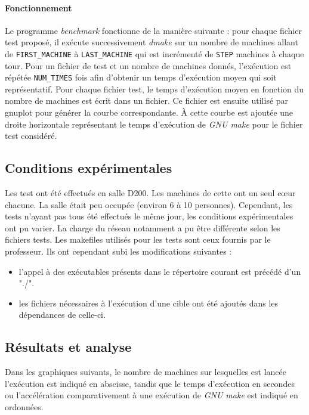 \documentclass[a4paper,12pt,twoside]{article}
\begin{document}
\paragraph{Fonctionnement}

Le programme \emph{benchmark} fonctionne de la manière suivante : pour
chaque fichier test proposé, il exécute successivement \emph{dmake} sur un nombre de
machines allant de \texttt{FIRST\_MACHINE} à \texttt{LAST\_MACHINE}
qui est incrémenté de \texttt{STEP} machines à chaque tour. Pour un
fichier de test et un nombre de machines donnés, l'exécution est
répétée \texttt{NUM\_TIMES} fois afin d'obtenir un temps d'exécution moyen
qui soit représentatif. 
Pour chaque fichier test, le temps d'exécution moyen en fonction du
nombre de machines est écrit dans un fichier. Ce fichier est ensuite
utilisé par gnuplot pour générer la courbe correspondante. À cette
courbe est ajoutée une droite horizontale représentant le temps
d'exécution de \emph{GNU make} pour le fichier test considéré. 

\subsection{Conditions expérimentales}

Les test ont été effectués en salle D200. Les machines de cette ont un
seul cœur chacune. La salle était peu occupée
(environ 6 à 10 personnes). Cependant, les tests n'ayant pas tous été
effectués le même jour, les conditions expérimentales ont pu
varier. La charge du réseau notamment a pu être différente selon les
fichiers tests. Les makefiles utilisés pour les tests sont ceux
fournis par le professeur. Ils ont cependant subi les modifications
suivantes : 
\begin{itemize}
\item l'appel à des exécutables présents dans le répertoire courant est
  précédé d'un "./".
\item les fichiers nécessaires à l'exécution d'une cible ont été
  ajoutés dans les dépendances de celle-ci.
\end{itemize}

\subsection{Résultats et analyse}

Dans les graphiques suivants, le nombre de machines sur lesquelles est
lancée l'exécution est indiqué en abscisse, tandis que le temps
d'exécution en secondes ou l'accélération comparativement à une
exécution de \emph{GNU make} est indiqué en ordonnées.
\end{document}
